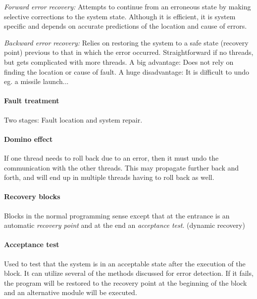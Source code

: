 \textit{Forward error recovery:} Attempts to continue from an erroneous state by making selective corrections to the system state. Although it is efficient, it is system specific and depends on accurate predictions of the location and cause of errors.

\textit{Backward error recovery:} Relies on restoring the system to a safe state (recovery point) previous to that in which the error occurred. Straightforward if no threads, but gets complicated with more threads. A big advantage: Does not rely on finding the location or cause of fault. A huge disadvantage: It is difficult to undo eg. a missile launch...

\paragraph{Fault treatment} Two stages: Fault location and system repair.

\paragraph{Domino effect} If one thread needs to roll back due to an error, then it must undo the communication with the other threads. This may propagate further back and forth, and will end up in multiple threads having to roll back as well.

\paragraph{Recovery blocks} Blocks in the normal programming sense except that at the entrance is an automatic \textit{recovery point} and at the end an \textit{acceptance test}. (dynamic recovery)


\paragraph{Acceptance test} Used to test that the system is in an acceptable state after the execution of the block. It can utilize several of the methods discussed for error detection. If it fails, the program will be restored to the recovery point at the beginning of the block and an alternative module will be executed.

